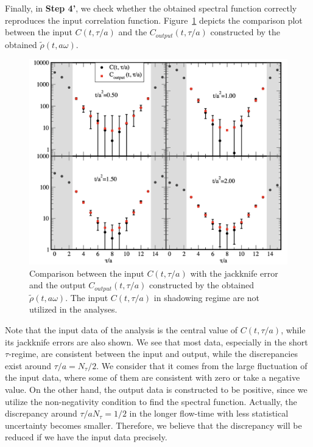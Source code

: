 \documentclass[a4paper,11pt]{article}
\begin{document}
Finally, in {\bf Step 4'}, we check whether the obtained spectral function correctly reproduces the input correlation function.
Figure~\ref{fig:comp-Ctau-center-ana} depicts the comparison plot between the input $C(t,\tau/a)$ and the $C_{output}(t,\tau/a)$ constructed by the obtained $\tilde{\rho}(t, a\omega)$.
\begin{figure}[h]
\begin{center}
\includegraphics[scale=0.35]{./Comp-Ctau-in-out-center-ana-shadow.pdf}
\caption{Comparison between the input $C(t,\tau/a)$ with the jackknife error and the output $C_{output}(t,\tau/a)$ constructed by the obtained $\tilde{\rho}(t,a\omega)$.  The input $C(t,\tau/a)$ in shadowing regime are not utilized in the analyses. }
\label{fig:comp-Ctau-center-ana}
\end{center}
\end{figure}
Note that the input data of the analysis is the central value of $C(t,\tau/a)$, while its jackknife errors are also shown.
We see that most data, especially in the short $\tau$-regime, are consistent between the input and output, while the discrepancies exist around $\tau/a= N_\tau/2$.
We consider that it comes from the large fluctuation of the input data, where some of them are consistent with zero or take a negative value. 
On the other hand, the output data is constructed to be positive, since we utilize the non-negativity condition to find the spectral function.
Actually, the discrepancy around $\tau/aN_\tau=1/2$ in the longer flow-time with less statistical uncertainty becomes smaller.  
Therefore, we believe that the discrepancy will be reduced if we have the input data precisely.
\end{document}
